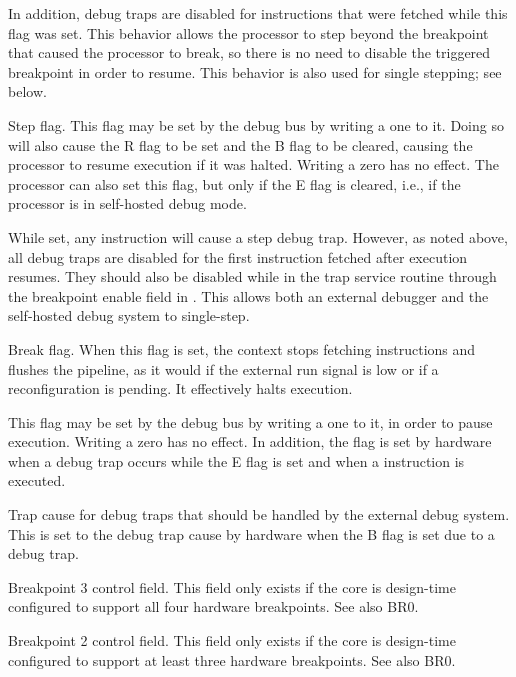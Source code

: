 In addition, debug traps are disabled for instructions that were fetched while
this flag was set. This behavior allows the processor to step beyond the
breakpoint that caused the processor to break, so there is no need to disable
the triggered breakpoint in order to resume. This behavior is also used for
single stepping; see below.

\debugCanWrite{}
\coreCanWrite{}

Step flag. This flag may be set by the debug bus by writing a one to it. Doing
so will also cause the R flag to be set and the B flag to be cleared, causing
the processor to resume execution if it was halted. Writing a zero has no
effect. The processor can also set this flag, but only if the E flag is cleared,
i.e., if the processor is in self-hosted debug mode.

While set, any instruction will cause a step debug trap. However, as noted
above, all debug traps are disabled for the first instruction fetched after
execution resumes. They should also be disabled while in the trap service
routine through the breakpoint enable field in . This allows both an
external debugger and the self-hosted debug system to single-step.

\debugCanWrite{}

Break flag. When this flag is set, the context stops fetching instructions and
flushes the pipeline, as it would if the external run signal is low or if a
reconfiguration is pending. It effectively halts execution.

This flag may be set by the debug bus by writing a one to it, in order to pause
execution. Writing a zero has no effect. In addition, the flag is set by
hardware when a debug trap occurs while the E flag is set and when a 
instruction is executed.


Trap cause for debug traps that should be handled by the external debug system.
This is set to the debug trap cause by hardware when the B flag is set due to a
debug trap.

\debugCanWrite{}
\coreCanWrite{}

Breakpoint 3 control field. This field only exists if the core is design-time
configured to support all four hardware breakpoints. See also BR0.

\debugCanWrite{}
\coreCanWrite{}

Breakpoint 2 control field. This field only exists if the core is design-time
configured to support at least three hardware breakpoints. See also BR0.

